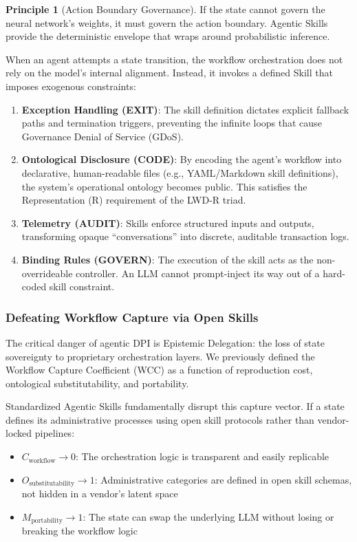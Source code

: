 \documentclass[11pt,a4paper]{article}
\theoremstyle{definition}
\newtheorem{principle}{Principle}[section]
\begin{document}
\begin{principle}[Action Boundary Governance]
If the state cannot govern the neural network's weights, it must govern the action boundary. Agentic Skills provide the deterministic envelope that wraps around probabilistic inference.
\end{principle}

When an agent attempts a state transition, the workflow orchestration does not rely on the model's internal alignment. Instead, it invokes a defined Skill that imposes exogenous constraints:

\begin{enumerate}[noitemsep]
    \item \textbf{Exception Handling (EXIT)}: The skill definition dictates explicit fallback paths and termination triggers, preventing the infinite loops that cause Governance Denial of Service (GDoS).
    \item \textbf{Ontological Disclosure (CODE)}: By encoding the agent's workflow into declarative, human-readable files (e.g., YAML/Markdown skill definitions), the system's operational ontology becomes public. This satisfies the Representation (R) requirement of the LWD-R triad.
    \item \textbf{Telemetry (AUDIT)}: Skills enforce structured inputs and outputs, transforming opaque ``conversations'' into discrete, auditable transaction logs.
    \item \textbf{Binding Rules (GOVERN)}: The execution of the skill acts as the non-overrideable controller. An LLM cannot prompt-inject its way out of a hard-coded skill constraint.
\end{enumerate}

\subsubsection{Defeating Workflow Capture via Open Skills}

The critical danger of agentic DPI is Epistemic Delegation: the loss of state sovereignty to proprietary orchestration layers. We previously defined the Workflow Capture Coefficient (WCC) as a function of reproduction cost, ontological substitutability, and portability.

Standardized Agentic Skills fundamentally disrupt this capture vector. If a state defines its administrative processes using open skill protocols rather than vendor-locked pipelines:

\begin{itemize}[noitemsep]
    \item $C_{\text{workflow}} \to 0$: The orchestration logic is transparent and easily replicable
    \item $O_{\text{substitutability}} \to 1$: Administrative categories are defined in open skill schemas, not hidden in a vendor's latent space
    \item $M_{\text{portability}} \to 1$: The state can swap the underlying LLM without losing or breaking the workflow logic
\end{itemize}
\end{document}
